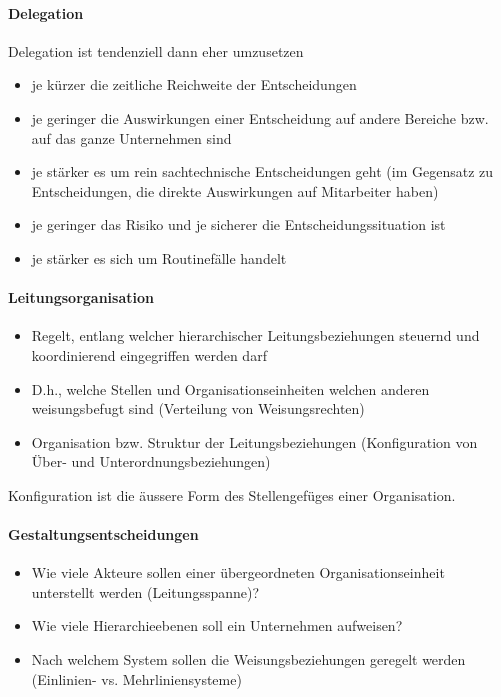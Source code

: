 \paragraph{Delegation}
Delegation ist tendenziell dann eher umzusetzen
\begin{itemize}
	\item je kürzer die zeitliche Reichweite der Entscheidungen
	\item je geringer die Auswirkungen einer Entscheidung auf andere Bereiche bzw. auf das ganze Unternehmen sind
	\item je stärker es um rein sachtechnische Entscheidungen geht (im Gegensatz zu Entscheidungen, die direkte Auswirkungen auf Mitarbeiter haben)
	\item je geringer das Risiko und je sicherer die Entscheidungssituation ist
	\item je stärker es sich um Routinefälle handelt
\end{itemize}

\paragraph{Leitungsorganisation}
\begin{itemize}
	\item Regelt, entlang welcher hierarchischer Leitungsbeziehungen steuernd und koordinierend eingegriffen werden darf
	\item D.h., welche Stellen und Organisationseinheiten welchen anderen weisungsbefugt sind (Verteilung von Weisungsrechten)
	\item Organisation bzw. Struktur der Leitungsbeziehungen (Konfiguration von Über- und Unterordnungsbeziehungen)
\end{itemize}
Konfiguration ist die äussere Form des Stellengefüges einer Organisation.

\paragraph{Gestaltungsentscheidungen}
\begin{itemize}
	\item Wie viele Akteure sollen einer übergeordneten Organisationseinheit unterstellt werden (Leitungsspanne)?
	\item Wie viele Hierarchieebenen soll ein Unternehmen aufweisen?
	\item Nach welchem System sollen die Weisungsbeziehungen geregelt werden (Einlinien- vs. Mehrliniensysteme)
\end{itemize}


